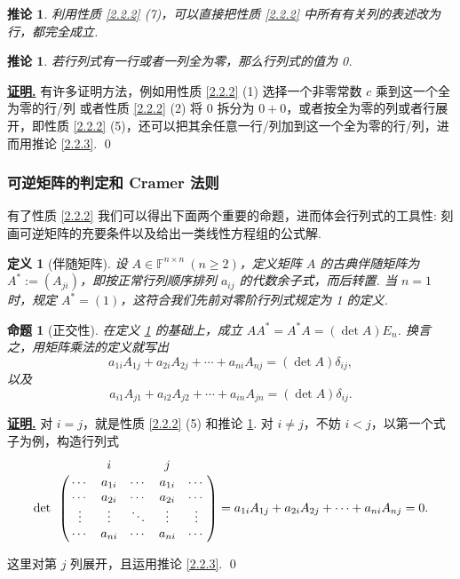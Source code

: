 \documentclass[10pt,openany]{article}
\theoremstyle{thmstyle} %
\theoremstyle{defstyle} %
\newtheorem{definition}[theorem]{定义}
\newtheorem{corollary}[theorem]{推论}
\theoremstyle{prostyle} %
\newtheorem{proposition}[theorem]{命题}
\theoremstyle{exastyle}
\theoremstyle{remstyle}
\renewenvironment{proof}[1][证明]{\par\underline{\textbf{#1.}} \;\fangsong}{\qed\par}
\newcommand{\F}{\mathbb{F}}
\newcommand{\n}{^{n \times n}}
\begin{document}
\begin{corollary}	\label{2.2.4}
	利用性质 \ref{2.2.2} (7)，可以直接把性质 \ref{2.2.2} 中所有有关列的表述改为行，都完全成立.

\end{corollary}

\begin{corollary}\label{2.2.5}
	若行列式有一行或者一列全为零，那么行列式的值为 0.
	
\end{corollary}

\begin{proof}
	有许多证明方法，例如用性质 \ref{2.2.2} (1) 选择一个非零常数 \( c \) 乘到这一个全为零的行/列 或者性质 \ref{2.2.2} (2) 将 \( 0 \) 拆分为 \( 0+0 \)，或者按全为零的列或者行展开，即性质 \ref{2.2.2} (5)，还可以把其余任意一行/列加到这一个全为零的行/列，进而用推论 \ref{2.2.3}. 
\end{proof}

\subsubsection{可逆矩阵的判定和 Cramer 法则}

有了性质 \ref{2.2.2} 我们可以得出下面两个重要的命题，进而体会行列式的工具性: 刻画可逆矩阵的充要条件以及给出一类线性方程组的公式解.

\begin{definition}[伴随矩阵]\label{2.2.6}
	设 \( A \in \F\n \ (n \geq 2) \)，定义矩阵 \( A \) 的古典伴随矩阵为 \( A^*:=(A_{ji}) \)，即按正常行列顺序排列 \( a_{ij} \) 的代数余子式，而后转置. 当 \( n=1 \) 时，规定 \( A^*=(1) \)，这符合我们先前对零阶行列式规定为 1 的定义.
	
\end{definition}

\begin{proposition}[正交性]	\label{2.2.7}
	在定义 \ref{2.2.6} 的基础上，成立 \( AA^*=A^*A=(\det A)E_n \). 换言之，用矩阵乘法的定义就写出
	\[ a_{1i}A_{1j}+a_{2i}A_{2j}+\cdots+a_{ni}A_{nj}=(\det A)\delta_{ij}, \]
	以及
	\[ a_{i1}A_{j1}+a_{i2}A_{j2}+\cdots+a_{in}A_{jn}=(\det A)\delta_{ij}. \]

\end{proposition}

\begin{proof}
	对 \( i=j \)，就是性质 \ref{2.2.2} (5) 和推论 \ref{2.2.4}. 对 \( i \neq j \)，不妨 \( i<j \)，以第一个式子为例，构造行列式
	\[ \det \bordermatrix{
		& & i & & j &  \cr
		&\cdots & a_{1i} & \cdots & a_{1i} & \cdots \cr
		&\cdots & a_{2i} & \cdots & a_{2i} & \cdots \cr
		&\vdots & \vdots & \ddots & \vdots & \vdots \cr
		&\cdots & a_{ni} & \cdots & a_{ni} & \cdots 
	}= a_{1i}A_{1j}+a_{2i}A_{2j}+\cdots+a_{ni}A_{nj}=0. \]
	
	这里对第 \( j \) 列展开，且运用推论 \ref{2.2.3}.
\end{proof}
\end{document}

